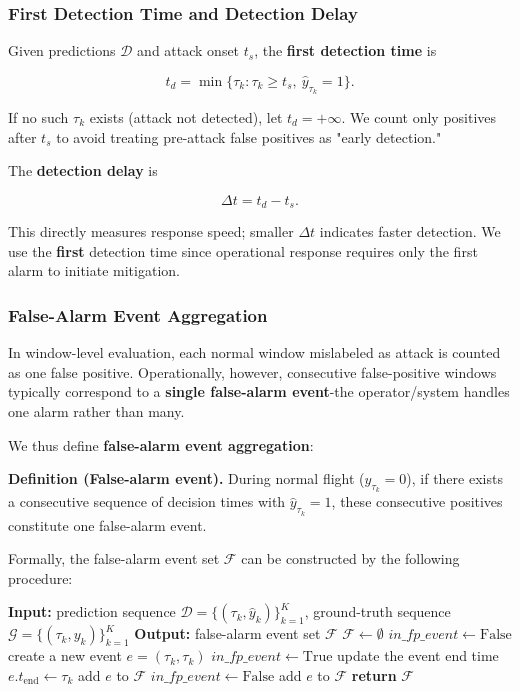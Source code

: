 \documentclass{ieeeaccess}
\begin{document}
\subsubsection{First Detection Time and Detection Delay}

Given predictions \(\mathcal{D}\) and attack onset \(t_s\), the \textbf{first detection time} is

\begin{equation}
 t_d = \min \{\tau_k : \tau_k \ge t_s,\ \hat{y}_{\tau_k}=1\}.
\end{equation}

If no such \(\tau_k\) exists (attack not detected), let \(t_d = +\infty\). We count only positives after \(t_s\) to avoid treating pre-attack false positives as "early detection."

The \textbf{detection delay} is

\begin{equation}
\Delta t = t_d - t_s.
\end{equation}

This directly measures response speed; smaller \(\Delta t\) indicates faster detection. We use the \textbf{first} detection time since operational response requires only the first alarm to initiate mitigation.

\subsubsection{False-Alarm Event Aggregation}

In window-level evaluation, each normal window mislabeled as attack is counted as one false positive. Operationally, however, consecutive false-positive windows typically correspond to a \textbf{single false-alarm event}-the operator/system handles one alarm rather than many.

We thus define \textbf{false-alarm event aggregation}:

\textbf{Definition (False-alarm event).} During normal flight (\(y_{\tau_k}=0\)), if there exists a consecutive sequence of decision times with \(\hat{y}_{\tau_k}=1\), these consecutive positives constitute one false-alarm event.

Formally, the false-alarm event set \(\mathcal{F}\) can be constructed by the following procedure:

\begin{algorithmic}[1]
\STATE \textbf{Input:} prediction sequence $\mathcal{D}=\{(\tau_k,\hat{y}_k)\}_{k=1}^K$, ground-truth sequence $\mathcal{G}=\{(\tau_k,y_k)\}_{k=1}^K$
\STATE \textbf{Output:} false-alarm event set $\mathcal{F}$
\STATE $\mathcal{F} \leftarrow \emptyset$
\STATE $in\_fp\_event \leftarrow \mathrm{False}$
\STATE create a new event $e=(\tau_k,\tau_k)$
\STATE $in\_fp\_event \leftarrow \mathrm{True}$
\ELSE
\STATE update the event end time $e.t_{\mathrm{end}} \leftarrow \tau_k$
\ENDIF
\ELSE
{}
\STATE add $e$ to $\mathcal{F}$
\STATE $in\_fp\_event \leftarrow \mathrm{False}$
\ENDIF
\ENDIF
\ENDFOR
{}
\STATE add $e$ to $\mathcal{F}$
\ENDIF
\STATE \textbf{return} $\mathcal{F}$
\end{algorithmic}
\end{document}
